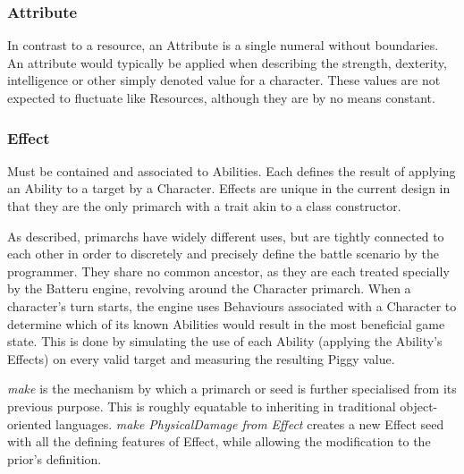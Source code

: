 \subsubsection{Attribute} 
In contrast to a resource, an Attribute is a single numeral without boundaries. An attribute would typically be applied when describing the strength, dexterity, intelligence or other simply denoted value for a character. These values are not expected to fluctuate like Resources, although they are by no means constant.

\subsubsection{Effect}
Must be contained and associated to Abilities. Each defines the result of applying an Ability to a target by a Character. Effects are unique in the current design  in that they are the only primarch with a trait akin to a class constructor.

\noindent As described, primarchs have widely different uses, but are tightly connected to each other in order to discretely and precisely define the battle scenario by the programmer. They share no common ancestor, as they are each treated specially by the Batteru engine, revolving around the Character primarch. When a character's turn starts, the engine uses Behaviours associated with a Character to determine which of its known Abilities would result in the most beneficial game state. This is done by simulating the use of each Ability (applying the Ability's Effects) on every valid target and measuring the resulting Piggy value.

\emph{make} is the mechanism by which a primarch or seed is further specialised from its previous purpose. This is roughly equatable to inheriting in traditional object-oriented languages. \emph{make PhysicalDamage from Effect} creates a new Effect seed with all the defining features of Effect, while allowing the modification to the prior's definition.

